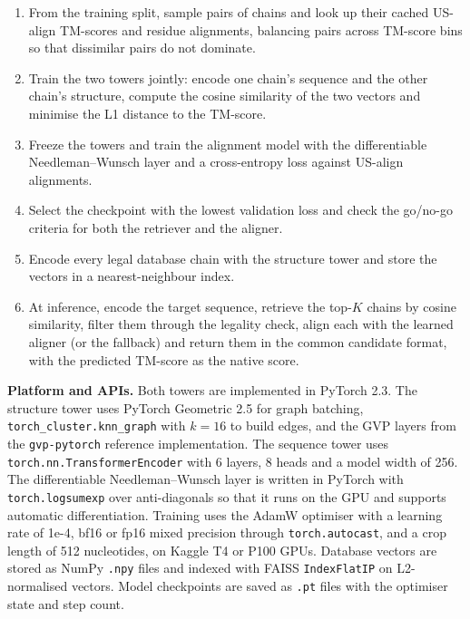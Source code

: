 \documentclass{FastFyp}
\begin{document}
\begin{enumerate}
\item From the training split, sample pairs of chains and look up their cached US-align TM-scores and residue alignments, balancing pairs across TM-score bins so that dissimilar pairs do not dominate.
\item Train the two towers jointly: encode one chain's sequence and the other chain's structure, compute the cosine similarity of the two vectors and minimise the L1 distance to the TM-score.
\item Freeze the towers and train the alignment model with the differentiable Needleman--Wunsch layer and a cross-entropy loss against US-align alignments.
\item Select the checkpoint with the lowest validation loss and check the go/no-go criteria for both the retriever and the aligner.
\item Encode every legal database chain with the structure tower and store the vectors in a nearest-neighbour index.
\item At inference, encode the target sequence, retrieve the top-$K$ chains by cosine similarity, filter them through the legality check, align each with the learned aligner (or the fallback) and return them in the common candidate format, with the predicted TM-score as the native score.
\end{enumerate}

\textbf{Platform and APIs.} Both towers are implemented in PyTorch 2.3. The structure tower uses PyTorch Geometric 2.5 for graph batching, \texttt{torch\_cluster.knn\_graph} with $k = 16$ to build edges, and the GVP layers from the \texttt{gvp-pytorch} reference implementation. The sequence tower uses \texttt{torch.nn.TransformerEncoder} with 6 layers, 8 heads and a model width of 256. The differentiable Needleman--Wunsch layer is written in PyTorch with \texttt{torch.logsumexp} over anti-diagonals so that it runs on the GPU and supports automatic differentiation. Training uses the AdamW optimiser with a learning rate of 1e-4, bf16 or fp16 mixed precision through \texttt{torch.autocast}, and a crop length of 512 nucleotides, on Kaggle T4 or P100 GPUs. Database vectors are stored as NumPy \texttt{.npy} files and indexed with FAISS \texttt{IndexFlatIP} on L2-normalised vectors. Model checkpoints are saved as \texttt{.pt} files with the optimiser state and step count.
\end{document}
